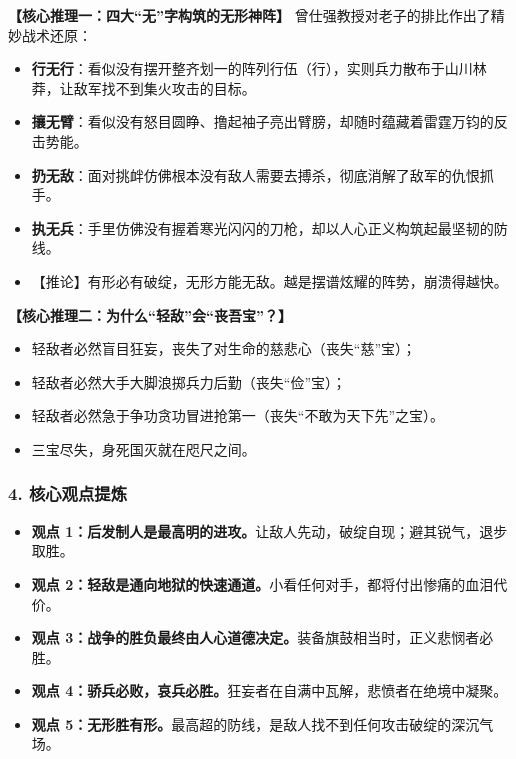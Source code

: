 \noindent\textbf{【核心推理一：四大“无”字构筑的无形神阵】}
曾仕强教授对老子的排比作出了精妙战术还原：
\begin{itemize}
    \item \textbf{行无行}：看似没有摆开整齐划一的阵列行伍（行），实则兵力散布于山川林莽，让敌军找不到集火攻击的目标。
    \item \textbf{攘无臂}：看似没有怒目圆睁、撸起袖子亮出臂膀，却随时蕴藏着雷霆万钧的反击势能。
    \item \textbf{扔无敌}：面对挑衅仿佛根本没有敌人需要去搏杀，彻底消解了敌军的仇恨抓手。
    \item \textbf{执无兵}：手里仿佛没有握着寒光闪闪的刀枪，却以人心正义构筑起最坚韧的防线。
    \item 【推论】有形必有破绽，无形方能无敌。越是摆谱炫耀的阵势，崩溃得越快。
\end{itemize}

\noindent\textbf{【核心推理二：为什么“轻敌”会“丧吾宝”？】}
\begin{itemize}
    \item 轻敌者必然盲目狂妄，丧失了对生命的慈悲心（丧失“慈”宝）；
    \item 轻敌者必然大手大脚浪掷兵力后勤（丧失“俭”宝）；
    \item 轻敌者必然急于争功贪功冒进抢第一（丧失“不敢为天下先”之宝）。
    \item 三宝尽失，身死国灭就在咫尺之间。
\end{itemize}

\subsubsection{4. 核心观点提炼}
\begin{itemize}
    \item \textbf{观点 1：后发制人是最高明的进攻。}让敌人先动，破绽自现；避其锐气，退步取胜。
    \item \textbf{观点 2：轻敌是通向地狱的快速通道。}小看任何对手，都将付出惨痛的血泪代价。
    \item \textbf{观点 3：战争的胜负最终由人心道德决定。}装备旗鼓相当时，正义悲悯者必胜。
    \item \textbf{观点 4：骄兵必败，哀兵必胜。}狂妄者在自满中瓦解，悲愤者在绝境中凝聚。
    \item \textbf{观点 5：无形胜有形。}最高超的防线，是敌人找不到任何攻击破绽的深沉气场。
\end{itemize}


